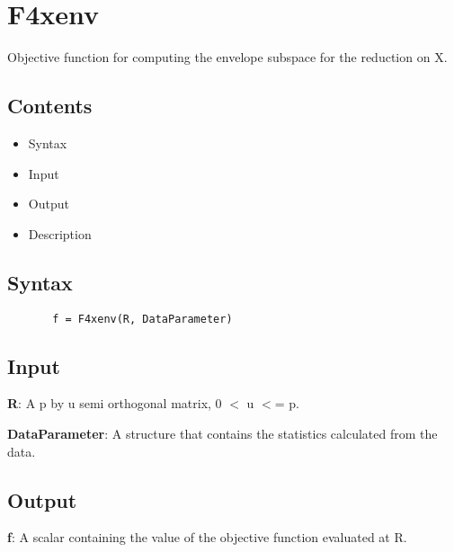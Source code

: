 \documentclass[a4paper,11pt,openany]{memoir}
\begin{document}
\newpage

\rmfamily
\color{black}\section{F4xenv}

\begin{par}
Objective function for computing the envelope subspace for the reduction on X.
\end{par} \vspace{1em}

\subsection*{Contents}

\begin{itemize}
\setlength{\itemsep}{-1ex}
   \item Syntax
   \item Input
   \item Output
   \item Description
\end{itemize}


\subsection*{Syntax}


\begin{verbatim}       f = F4xenv(R, DataParameter)\end{verbatim}
    

\subsection*{Input}

\begin{par}
\textbf{R}: A p by u semi orthogonal matrix, 0 \ensuremath{<} u \ensuremath{<}= p.
\end{par} \vspace{1em}
\begin{par}
\textbf{DataParameter}: A structure that contains the statistics calculated from the data.
\end{par} \vspace{1em}


\subsection*{Output}

\begin{par}
\textbf{f}: A scalar containing the value of the objective function evaluated at R.
\end{par} \vspace{1em}
\end{document}
